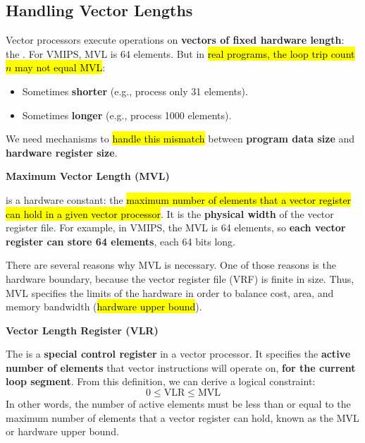 \subsection{Handling Vector Lengths}

Vector processors execute operations on \textbf{vectors of fixed hardware length}: the . For VMIPS, MVL is 64 elements. But in \hl{real programs, the loop trip count $n$ may not equal MVL}:
\begin{itemize}
    \item Sometimes \textbf{shorter} (e.g., process only 31 elements).
    \item Sometimes \textbf{longer} (e.g., process 1000 elements).
\end{itemize}
We need mechanisms to \hl{handle this mismatch} between \textbf{program data size} and \textbf{hardware register size}.

\highspace
\begin{flushleft}
    \textcolor{Green3}{ \textbf{Maximum Vector Length (MVL)}}
\end{flushleft}
 is a hardware constant: the \hl{maximum number of elements that a vector register can hold in a given vector processor}. It is the \textbf{physical width} of the vector register file. For example, in VMIPS, the MVL is 64 elements, so \textbf{each vector register can store 64 elements}, each 64 bits long.

\highspace
There are several reasons why MVL is necessary. One of those reasons is the hardware boundary, because the vector register file (VRF) is finite in size. Thus, MVL specifies the limits of the hardware in order to balance cost, area, and memory bandwidth (\hl{hardware upper bound}).

\highspace
\begin{flushleft}
    \textcolor{Green3}{ \textbf{Vector Length Register (VLR)}}
\end{flushleft}
The  is a \textbf{special control register} in a vector processor. It specifies the \textbf{active number of elements} that vector instructions will operate on, \textbf{for the current loop segment}. From this definition, we can derive a logical constraint:
\begin{equation}
    0 \leq \text{VLR} \leq \text{MVL}
\end{equation}
In other words, the number of active elements must be less than or equal to the maximum number of elements that a vector register can hold, known as the MVL or hardware upper bound.

